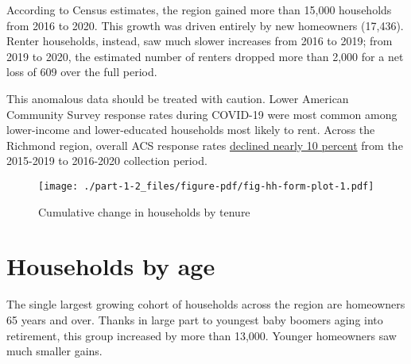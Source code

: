 \documentclass[
  letterpaper,
  DIV=11,
  numbers=noendperiod]{scrreprt}
\begin{document}
According to Census estimates, the region gained more than 15,000
households from 2016 to 2020. This growth was driven entirely by new
homeowners (17,436). Renter households, instead, saw much slower
increases from 2016 to 2019; from 2019 to 2020, the estimated number of
renters dropped more than 2,000 for a net loss of 609 over the full
period.

\begin{tcolorbox}[enhanced jigsaw, colframe=quarto-callout-warning-color-frame, arc=.35mm, bottomrule=.15mm, colbacktitle=quarto-callout-warning-color!10!white, opacityback=0, left=2mm, rightrule=.15mm, title=\textcolor{quarto-callout-warning-color}{\faExclamationTriangle}\hspace{0.5em}{Pandemic impacts on data reliability}, colback=white, coltitle=black, toptitle=1mm, leftrule=.75mm, titlerule=0mm, breakable, opacitybacktitle=0.6, toprule=.15mm, bottomtitle=1mm]

This anomalous data should be treated with caution. Lower American
Community Survey response rates during COVID-19 were most common among
lower-income and lower-educated households most likely to rent. Across
the Richmond region, overall ACS response rates
\href{https://www.prb.org/articles/capturing-covids-impact-on-the-american-community-survey-across-counties/}{declined
nearly 10 percent} from the 2015-2019 to 2016-2020 collection period.

\end{tcolorbox}

\begin{figure}

{\centering \texttt{[image: ./part-1-2\_files/figure-pdf/fig-hh-form-plot-1.pdf]}

}

\caption{\label{fig-hh-form-plot}Cumulative change in households by
tenure}

\end{figure}

\hypertarget{households-by-age}{%
\section{Households by age}\label{households-by-age}}

The single largest growing cohort of households across the region are
homeowners 65 years and over. Thanks in large part to youngest baby
boomers aging into retirement, this group increased by more than 13,000.
Younger homeowners saw much smaller gains.
\end{document}
